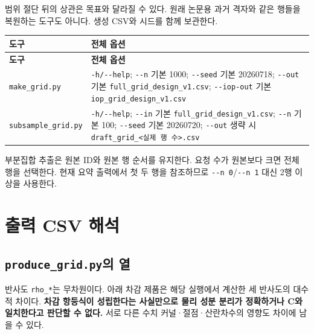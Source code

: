 범위 절단 뒤의 상관은 목표와 달라질 수 있다. 원래 논문용 과거 격자와 같은 행들을 복원하는 도구도 아니다. 생성 CSV와 시드를 함께 보관한다.


{\TableFont
\begin{longtable}{@{}>{\raggedright\arraybackslash}p{}>{\raggedright\arraybackslash}p{}@{}}
\toprule
\textbf{도구} & \textbf{전체 옵션} \\
\midrule
\endfirsthead
\toprule
\textbf{도구} & \textbf{전체 옵션} \\
\midrule
\endhead
\bottomrule
\endfoot
\texttt{make\_\allowbreak{}grid.\allowbreak{}py} & \texttt{-\allowbreak{}h/\allowbreak{}-\allowbreak{}-\allowbreak{}help}; \texttt{-\allowbreak{}-\allowbreak{}n} 기본 1000; \texttt{-\allowbreak{}-\allowbreak{}seed} 기본 20260718; \texttt{-\allowbreak{}-\allowbreak{}out} 기본 \texttt{full\_\allowbreak{}grid\_\allowbreak{}design\_\allowbreak{}v1.\allowbreak{}csv}; \texttt{-\allowbreak{}-\allowbreak{}iop-\allowbreak{}out} 기본 \texttt{iop\_\allowbreak{}grid\_\allowbreak{}design\_\allowbreak{}v1.\allowbreak{}csv} \\
\texttt{subsample\_\allowbreak{}grid.\allowbreak{}py} & \texttt{-\allowbreak{}h/\allowbreak{}-\allowbreak{}-\allowbreak{}help}; \texttt{-\allowbreak{}-\allowbreak{}in} 기본 \texttt{full\_\allowbreak{}grid\_\allowbreak{}design\_\allowbreak{}v1.\allowbreak{}csv}; \texttt{-\allowbreak{}-\allowbreak{}n} 기본 100; \texttt{-\allowbreak{}-\allowbreak{}seed} 기본 20260720; \texttt{-\allowbreak{}-\allowbreak{}out} 생략 시 \texttt{draft\_\allowbreak{}grid\_\allowbreak{}<실제 행 수>.\allowbreak{}csv} \\
\end{longtable}
}

부분집합 추출은 원본 ID와 원본 행 순서를 유지한다. 요청 수가 원본보다 크면 전체 행을 선택한다. 현재 요약 출력에서 첫 두 행을 참조하므로 \texttt{-\allowbreak{}-\allowbreak{}n 0}/\texttt{-\allowbreak{}-\allowbreak{}n 1} 대신 2행 이상을 사용한다.

\section{출력 CSV 해석}
\label{sec:auto:06_python_batch:8}
\subsection{\texttt{produce\_\allowbreak{}grid.\allowbreak{}py}의 열}
\label{sec:auto:06_python_batch:8.1}
반사도 \texttt{rho\_\allowbreak{}*}는 무차원이다. 아래 차감 제품은 해당 실행에서 계산한 세 반사도의 대수적 차이다. \textbf{차감 항등식이 성립한다는 사실만으로 물리 성분 분리가 정확하거나 C와 일치한다고 판단할 수 없다.} 서로 다른 수치 커널·절점·산란차수의 영향도 차이에 남을 수 있다.


